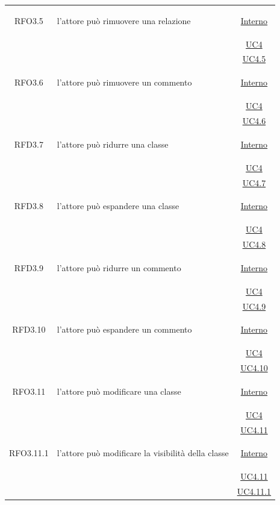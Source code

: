 \begin{longtable}{|c|>{\centering}m{7cm}|c|}
\hypertarget{RFO3.5}{RFO3.5} & l'attore può rimuovere una relazione &  \hyperlink{Interno}{Interno}\\
& &\hyperref[UC4]{UC4}\\
& &\hyperref[UC4.5]{UC4.5}\\ \hline

\hypertarget{RFO3.6}{RFO3.6} & l'attore può rimuovere un commento &  \hyperlink{Interno}{Interno}\\
& &\hyperref[UC4]{UC4}\\
& &\hyperref[UC4.6]{UC4.6}\\ \hline

\hypertarget{RFD3.7}{RFD3.7} & l'attore può ridurre una classe &  \hyperlink{Interno}{Interno}\\
& &\hyperref[UC4]{UC4}\\
& &\hyperref[UC4.7]{UC4.7}\\ \hline

\hypertarget{RFD3.8}{RFD3.8} & l'attore può espandere una classe &  \hyperlink{Interno}{Interno}\\
& &\hyperref[UC4]{UC4}\\
& &\hyperref[UC4.8]{UC4.8}\\ \hline

\hypertarget{RFD3.9}{RFD3.9} & l'attore può ridurre un commento &  \hyperlink{Interno}{Interno}\\
& &\hyperref[UC4]{UC4}\\
& &\hyperref[UC4.9]{UC4.9}\\ \hline

\hypertarget{RFD3.10}{RFD3.10} & l'attore può espandere un commento &  \hyperlink{Interno}{Interno}\\
& &\hyperref[UC4]{UC4}\\
& &\hyperref[UC4.10]{UC4.10}\\ \hline

\hypertarget{RFO3.11}{RFO3.11} & l'attore può modificare una classe &  \hyperlink{Interno}{Interno}\\
& &\hyperref[UC4]{UC4}\\
& &\hyperref[UC4.11]{UC4.11}\\ \hline

\hypertarget{RFO3.11.1}{RFO3.11.1} & l'attore può modificare la visibilità della classe &  \hyperlink{Interno}{Interno}\\
& &\hyperref[UC4.11]{UC4.11}\\
& &\hyperref[UC4.11.1]{UC4.11.1}\\ \hline


\end{longtable}

